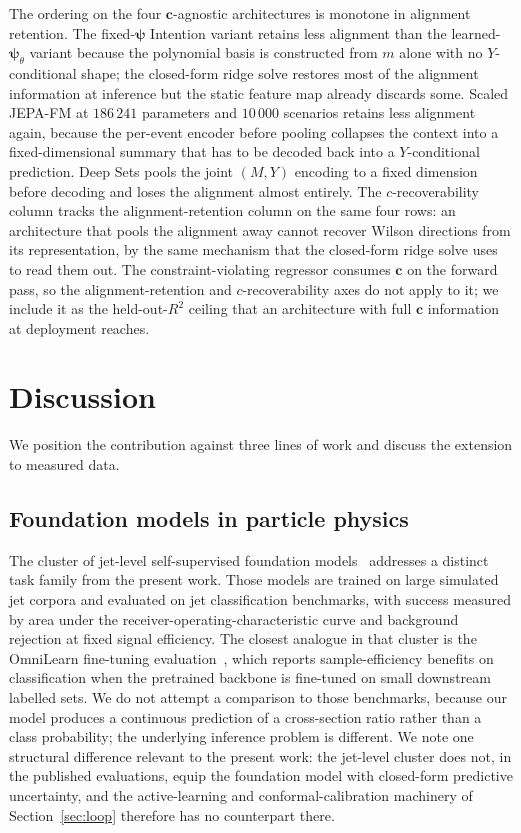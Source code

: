 \documentclass[11pt,a4paper]{article}
\newcommand{\psib}{\bm{\psi}}
\begin{document}
The ordering on the four $\bm{c}$-agnostic architectures is monotone in alignment retention. The fixed-$\psib$ Intention variant retains less alignment than the learned-$\psib_\theta$ variant because the polynomial basis is constructed from $m$ alone with no $Y$-conditional shape; the closed-form ridge solve restores most of the alignment information at inference but the static feature map already discards some. Scaled JEPA-FM at $186\,241$ parameters and $10\,000$ scenarios retains less alignment again, because the per-event encoder before pooling collapses the context into a fixed-dimensional summary that has to be decoded back into a $Y$-conditional prediction. Deep Sets pools the joint $(M,Y)$ encoding to a fixed dimension before decoding and loses the alignment almost entirely. The $c$-recoverability column tracks the alignment-retention column on the same four rows: an architecture that pools the alignment away cannot recover Wilson directions from its representation, by the same mechanism that the closed-form ridge solve uses to read them out. The constraint-violating regressor consumes $\bm{c}$ on the forward pass, so the alignment-retention and $c$-recoverability axes do not apply to it; we include it as the held-out-$R^2$ ceiling that an architecture with full $\bm{c}$ information at deployment reaches.

\section{Discussion}
\label{sec:discussion}

We position the contribution against three lines of work and discuss the extension to measured data.

\subsection{Foundation models in particle physics}

The cluster of jet-level self-supervised foundation models~\cite{Mikuni:2024omnilearn,Mikuni:2025omnilearned,Heinrich:2024mpm,Birk:2024omnijet,Bardhan:2025hepjepa,Sophon:2024} addresses a distinct task family from the present work. Those models are trained on large simulated jet corpora and evaluated on jet classification benchmarks, with success measured by area under the receiver-operating-characteristic curve and background rejection at fixed signal efficiency. The closest analogue in that cluster is the OmniLearn fine-tuning evaluation~\cite{Mikuni:2024omnilearn,Mikuni:2025omnilearned}, which reports sample-efficiency benefits on classification when the pretrained backbone is fine-tuned on small downstream labelled sets. We do not attempt a comparison to those benchmarks, because our model produces a continuous prediction of a cross-section ratio rather than a class probability; the underlying inference problem is different. We note one structural difference relevant to the present work: the jet-level cluster does not, in the published evaluations, equip the foundation model with closed-form predictive uncertainty, and the active-learning and conformal-calibration machinery of Section~\ref{sec:loop} therefore has no counterpart there.
\end{document}
